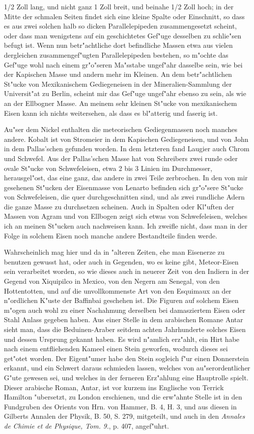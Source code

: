 \documentclass[a4paper, 11pt, oneside, polutonikogreek, german]{article}
\begin{document}
1/2 Zoll lang, und nicht ganz 1 Zoll breit, und beinahe 1/2 Zoll hoch; in der Mitte der schmalen Seiten findet sich eine kleine Spalte oder Einschnitt, so dass es aus zwei solchen halb so dicken Parallelepipeden zusammengesetzt scheint, oder dass man wenigstens auf ein geschichtetes Gef"uge desselben zu schlie"sen befugt ist. Wenn nun betr"achtliche dort befindliche Massen etwa aus vielen dergleichen zusammengef"ugten Parallelepipeden bestehen, so m"ochte das Gef"uge wohl nach einem gr"o"seren Ma"sstabe ungef"ahr dasselbe sein, wie bei der Kapischen Masse und andern mehr im Kleinen. An dem betr"achtlichen St"ucke von Mexikanischem Gediegeneisen in der Mineralien-Sammlung der Universit"at zu Berlin, scheint mir das Gef"uge ungef"ahr ebenso zu sein, als wie an der Ellbogner Masse. An meinem sehr kleinen St"ucke von mexikanischem Eisen kann ich nichts weitersehen, als dass es bl"atterig und faserig ist.

Au"ser dem Nickel enthalten die meteorischen Gediegenmassen noch manches andere. Kobalt ist von Stromeier in dem Kapischen Gediegeneisen, und von John in dem Pallas'schen gefunden worden. In dem letzteren fand Laugier auch Chrom und Schwefel. Aus der Pallas'schen Masse hat von Schreibers zwei runde oder ovale St"ucke von Schwefeleisen, etwa 2 bis 3 Linien im Durchmesser, herausgel"ost, das eine ganz, das andere in zwei Teile zerbrochen. In den von mir gesehenen St"ucken der Eisenmasse von Lenarto befinden sich gr"o"sere St"ucke von Schwefeleisen, die quer durchgeschnitten sind, und als zwei rundliche Adern die ganze Masse zu durchsetzen scheinen. Auch in Spalten oder Kl"uften der Massen von Agram und von Ellbogen zeigt sich etwas von Schwefeleisen, welches ich an meinen St"ucken auch nachweisen kann. Ich zweifle nicht, dass man in der Folge in solchem Eisen noch manche andere Bestandteile finden werde.

Wahrscheinlich mag hier und da in "alteren Zeiten, ehe man Eisenerze zu benutzen gewusst hat, oder auch in Gegenden, wo es keine gibt, Meteor-Eisen sein verarbeitet worden, so wie dieses auch in neuerer Zeit von den Indiern in der Gegend von Xiquipilco in Mexico, von den Negern am Senegal, von den Hottentotten, und auf die unvollkommenste Art von den Esquimaux an der n"ordlichen K"uste der Baffinbai geschehen ist. Die Figuren auf solchem Eisen m"ogen auch wohl zu einer Nachahmung derselben bei damasziertem Eisen oder Stahl Anlass gegeben haben. Aus einer Stelle in dem arabischen Romane Antar sieht man, dass die Beduinen-Araber seitdem achten Jahrhunderte solches Eisen und dessen Ursprung gekannt haben. Es wird n"amlich erz"ahlt, ein Hirt habe nach einem entfliehenden Kameel einen Stein geworfen, wodurch dieses sei get"otet worden. Der Eigent"umer habe den Stein sogleich f"ur einen Donnerstein erkannt, und ein Schwert daraus schmieden lassen, welches von au"serordentlicher G"ute gewesen sei, und welches in der ferneren Erz"ahlung eine Hauptrolle spielt. Dieser arabische Roman, Antar, ist vor kurzem ins Englische von Terrick Hamilton "ubersetzt, zu London erschienen, und die erw"ahnte Stelle ist in den Fundgruben des Orients von Hrn. von Hammer, B. 4, H. 3, und aus diesen in Gilberts Annalen der Physik, B. 50, S. 279, mitgeteilt, und auch in den \emph{Annales de Chimie et de Physique, Tom. 9.}, p. 407, angef"uhrt.
\end{document}
